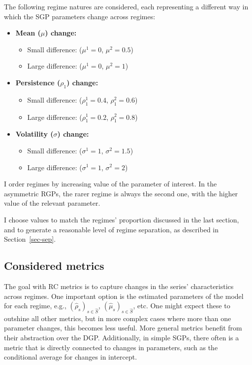 \documentclass[
  letterpaper,
  DIV=11,
  numbers=noendperiod]{scrartcl}
\providecommand{\tightlist}{%
  \setlength{\itemsep}{0pt}\setlength{\parskip}{0pt}}\usepackage{longtable,booktabs,array}
\numberwithin{equation}{section}
\numberwithin{table}{section}
\numberwithin{figure}{section}
\begin{document}
The following regime natures are considered, each representing a
different way in which the SGP parameters change across regimes:

\begin{itemize}
\tightlist
\item
  \textbf{Mean (\(\mu\)) change:}

  \begin{itemize}
  \tightlist
  \item
    Small difference: (\(\mu^1 = 0\), \(\mu^2 = 0.5\))
  \item
    Large difference: (\(\mu^1 = 0\), \(\mu^2 = 1\))
  \end{itemize}
\item
  \textbf{Persistence (\(\rho_1\)) change:}

  \begin{itemize}
  \tightlist
  \item
    Small difference: (\(\rho_1^1 = 0.4\), \(\rho_1^2 = 0.6\))
  \item
    Large difference: (\(\rho_1^1 = 0.2\), \(\rho_1^2 = 0.8\))
  \end{itemize}
\item
  \textbf{Volatility (\(\sigma\)) change:}

  \begin{itemize}
  \tightlist
  \item
    Small difference: (\(\sigma^1 = 1\), \(\sigma^2 = 1.5\))
  \item
    Large difference: (\(\sigma^1 = 1\), \(\sigma^2 = 2\))
  \end{itemize}
\end{itemize}

I order regimes by increasing value of the parameter of interest. In the
asymmetric RGPs, the rarer regime is always the second one, with the
higher value of the relevant parameter.

I choose values to match the regimes' proportion discussed in the last
section, and to generate a reasonable level of regime separation, as
described in Section~\ref{sec-sep}.

\subsection{Considered metrics}\label{sec-impl-metrics}

The goal with RC metrics is to capture changes in the series'
characteristics across regimes. One important option is the estimated
parameters of the model for each regime, e.g.,
\((\hat{\rho}_s)_{s \in \hat{S}}\), \((\hat{\mu}_s)_{s \in \hat{S}}\),
etc. One might expect these to outshine all other metrics, but in more
complex cases where more than one parameter changes, this becomes less
useful. More general metrics benefit from their abstraction over the
DGP. Additionally, in simple SGPs, there often is a metric that is
directly connected to changes in parameters, such as the conditional
average for changes in intercept.
\end{document}

